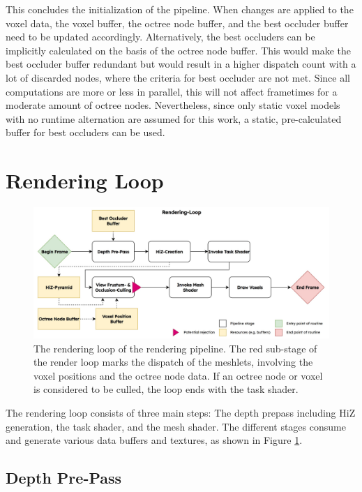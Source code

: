 \noindent
This concludes the initialization of the pipeline. When changes are applied to the voxel data, the voxel buffer,
the octree node buffer, and the best occluder buffer need to be updated accordingly. Alternatively, the best 
occluders can be implicitly calculated on the basis of the octree node buffer. This would make the best 
occluder buffer redundant but would result in a higher dispatch count with a lot of discarded nodes, 
where the criteria for best occluder are not met. Since all computations are more or less in parallel, this 
will not affect frametimes for a moderate amount of octree nodes. Nevertheless, since only static voxel models with 
no runtime alternation are assumed for this work, a static, pre-calculated buffer for best occluders can be used.


\section{Rendering Loop} \label{sec-rendering-loop}

\begin{figure}[h]
    \centering
    \includegraphics[width=\linewidth]{images/graphics/rendering-loop.jpg}
    \caption{The rendering loop of the rendering pipeline. The red sub-stage of the render loop marks the dispatch 
    of the meshlets, involving the voxel positions and the octree node data. If an octree node or voxel is considered 
    to be culled, the loop ends with the task shader.}
    \label{fig:pipeline-loop}
\end{figure}

\noindent
The rendering loop consists of three main steps: The depth prepass including \ac{HiZ} generation, the 
task shader, and the mesh shader. The different stages consume and generate various data buffers 
and textures, as shown in Figure \ref{fig:pipeline-loop}. 

\subsection*{Depth Pre-Pass} \label{subsec-depth-prepass}

